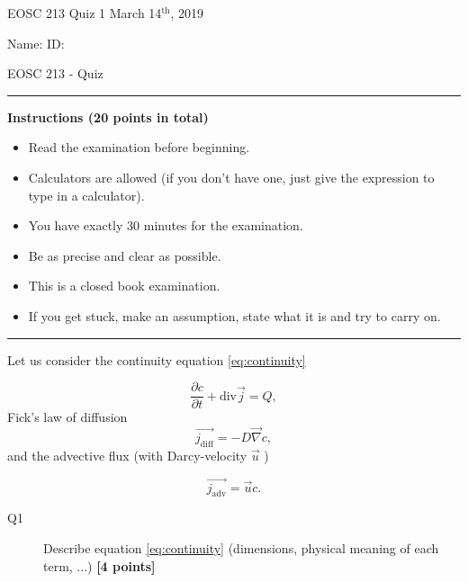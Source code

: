 \documentclass{article}
\begin{document}
\pagestyle{empty}

\large{EOSC 213 Quiz 1} \hspace{10cm} \large{March 14$^{\textrm{th}}$, 2019}

\large{Name:} \hspace{12cm} \large{ID: }
\begin{center}
\Huge{EOSC 213 - Quiz}
\end{center}

\rule{\textwidth}{1pt}

\large{\textbf{Instructions (20 points in total)}}
\begin{multicols}{2}
\begin{itemize}
\item Read the examination before beginning.
\item Calculators are allowed (if you don't have one, just give the expression to type in a calculator).
\item You have exactly 30 minutes for the examination.
\item Be as precise and clear as possible.
\item This is a closed book examination.
\item If you get stuck, make an assumption, state what it is and try to carry on.
\end{itemize} 
\end{multicols}


\rule{\textwidth}{1pt}




Let us consider the continuity equation \ref{eq:continuity}

\begin{equation}
\frac{\partial c}{\partial t} + \mathrm{div} \overrightarrow{j} = Q, \label{eq:continuity}
\end{equation} Fick's law of diffusion
\begin{equation}
\overrightarrow{j_{\mathrm{diff}}} = - D \overrightarrow{\nabla} c, \label{eq:fick}
\end{equation} and the advective flux (with Darcy-velocity $ \overrightarrow{u} $ )

\begin{equation}
\overrightarrow{j_{\mathrm{adv}}} = \overrightarrow{u} c. \label{eq:adv}
\end{equation}
\begin{description}
\item [Q1] Describe equation \ref{eq:continuity} (dimensions, physical meaning of each term, ...) \textbf{[4 points]}
\vspace{4cm}
\end{description}
\end{document}
